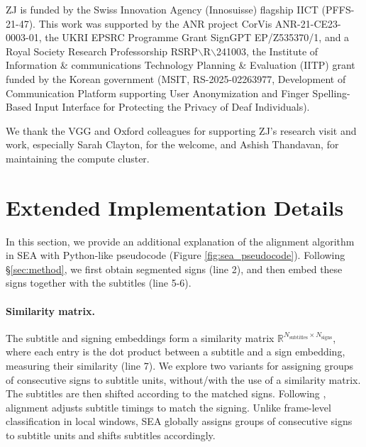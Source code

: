 \documentclass[11pt]{article}
\begin{document}
ZJ is funded by the Swiss Innovation Agency (Innosuisse) flagship IICT (PFFS-21-47). This work was supported by the ANR project
CorVis ANR-21-CE23-0003-01, the UKRI EPSRC Programme Grant SignGPT EP/Z535370/1, and a Royal Society
Research Professorship RSRP$\backslash$R$\backslash$241003,
the Institute of Information \& communications Technology Planning \& Evaluation (IITP) grant funded by the Korean government (MSIT, RS-2025-02263977, Development of Communication Platform supporting User Anonymization and Finger Spelling-Based Input Interface for Protecting the Privacy of Deaf Individuals).

We thank the VGG and Oxford colleagues for supporting ZJ's research visit and work, especially Sarah Clayton, for the welcome, and Ashish Thandavan, for maintaining the compute cluster.


%


\clearpage
\newpage
\appendix

\section{Extended Implementation Details}
\label{sec:extended_details}

In this section, we provide an additional explanation of the alignment algorithm in SEA with Python-like pseudocode (Figure \ref{fig:sea_pseudocode}).
Following \S\ref{sec:method}, we first obtain segmented signs (line 2), and then embed these signs together with the subtitles (line 5-6).

\paragraph{Similarity matrix.} The subtitle and signing embeddings form a similarity matrix \( \mathbb{R}^{N_{\text{subtitles}} \times N_{\text{signs}}} \), where each entry is the dot product between a subtitle and a sign embedding, measuring their similarity (line 7). 
We explore two variants for assigning groups of consecutive signs to subtitle units, without/with the use of a similarity matrix. The subtitles are then shifted according to the matched signs. 
Following \citet{bull2021aligning}, alignment adjusts subtitle timings to match the signing. 
Unlike frame-level classification in local windows, SEA globally assigns groups of consecutive signs to subtitle units and shifts subtitles accordingly.
\end{document}
